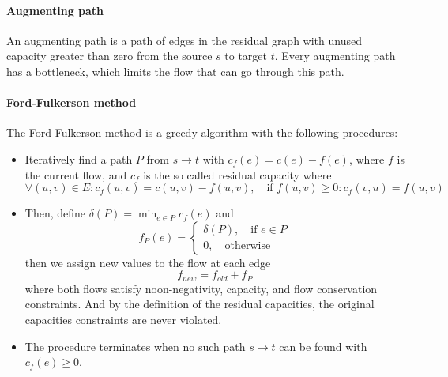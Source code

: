             \paragraph{Augmenting path}
                An augmenting path is a path of edges in the residual graph with unused capacity greater than zero from the source $s$ to target $t$. Every augmenting path has a bottleneck, which limits the flow that can go through this path.

            \paragraph{Ford-Fulkerson method}
                The Ford-Fulkerson method is a greedy algorithm with the following procedures:

                \begin{itemize}
                    \item Iteratively find a path $P$ from $s \rightarrow t$ with $c_f(e) = c(e) - f(e)$, where $f$ is the current flow, and $c_f$ is the so called residual capacity where
                    \begin{equation}
                        \forall (u, v) \in E: c_f(u, v) = c(u, v) - f(u, v),\quad \text{if } f(u, v) \ge 0: c_f(v, u) = f(u, v)
                    \end{equation}
                    \item Then, define $\delta(P) = \min_{e \in P} c_f(e)$ and
                    \begin{equation}
                        f_P(e) = \begin{cases}
                            \delta(P), \quad \text{if } e\in P\\0, \quad \text{otherwise}
                        \end{cases}
                    \end{equation}
                    then we assign new values to the flow at each edge
                    \begin{equation}
                        f_{new} = f_{old} + f_P
                    \end{equation}
                    where both flows satisfy noon-negativity, capacity, and flow conservation constraints. And by the definition of the residual capacities, the original capacities constraints are never violated.
                    \item The procedure terminates when no such path $s \rightarrow t$ can be found with $c_f(e) \ge 0$.
                \end{itemize}
                
